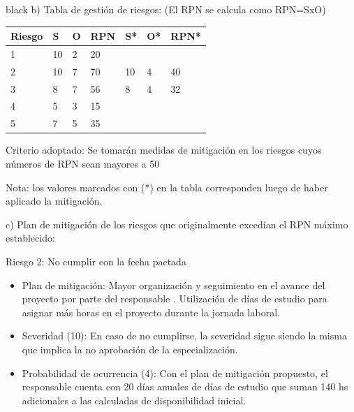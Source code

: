 \documentclass[11pt]{charter}
\begin{document}
\begin{consigna}{black}
b) Tabla de gestión de riesgos:      (El RPN se calcula como RPN=SxO)

\begin{table}[htpb]
\centering
\begin{tabularx}{\linewidth}{@{}|X|X|X|X|X|X|X|@{}}
\hline
\rowcolor[HTML]{C0C0C0} 
Riesgo & S & O & RPN & S* & O* & RPN* \\ \hline
   1    & 10  & 2  &  20   &    &    &      \\ \hline
   2    & 10  & 7  &  70   & 10   & 4   & 40     \\ \hline
   3    & 8  & 7  &   56  & 8   & 4   & 32     \\ \hline
   4    & 5 & 3  &   15  &    &    &      \\ \hline
   5    & 7 &  5 &   35  &    &    &      \\ \hline
\end{tabularx}%
\end{table}

Criterio adoptado: 
Se tomarán medidas de mitigación en los riesgos cuyos números de RPN sean mayores a 50

Nota: los valores marcados con (*) en la tabla corresponden luego de haber aplicado la mitigación.

c) Plan de mitigación de los riesgos que originalmente excedían el RPN máximo establecido:
 
Riesgo 2: No cumplir con la fecha pactada
\begin{itemize}
\item 
Plan de mitigación: Mayor organización y seguimiento en el avance del proyecto por parte del responsable \authorname .{} Utilización de días de estudio para asignar más horas en el proyecto durante la jornada laboral.
\item 
Severidad (10): En caso de no cumplirse, la severidad sigue siendo la misma que implica la no aprobación de la especialización.
\item 
Probabilidad de ocurrencia (4): Con el plan de mitigación propuesto, el responsable \authorname {} cuenta con 20 días anuales de días de estudio que suman 140 hs adicionales a las calculadas de disponibilidad inicial.
\end{itemize}


\end{consigna}
\end{document}
